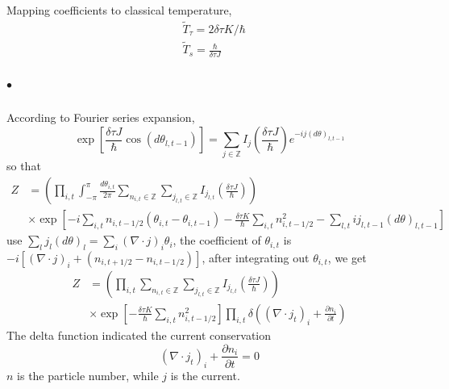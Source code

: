 Mapping coefficients to classical temperature, 
\begin{equation} \label{Temp_mapping}
    \begin{aligned}
        & \tilde{T}_{\tau} = 2 \delta \tau K /\hbar\\
        & \tilde{T}_{s} = \frac{\hbar}{\delta \tau J}
    \end{aligned}
\end{equation}
\subparagraph*{$\bullet$}
According to Fourier series expansion, 
\begin{equation}
    \exp \left[
        \frac{\delta \tau J}{\hbar} 
            \cos(d\theta_{l, t-1}) \right]
        = \sum_{j \in \mathbb{Z}} I_j(\frac{\delta \tau J}{\hbar} )
            e^{-ij(d\theta)_{l, t-1}}
\end{equation}
so that
\begin{equation}
    \begin{aligned}
        Z 
        & = \left(
            \prod_{i, t} \int_{-\pi}^{\pi} \frac{d\theta_{i, t}}{2\pi} 
            \sum_{n_{i, t} \in \mathbb{Z} }
            \sum_{j_{l, t} \in \mathbb{Z} } I_{j_{l, t}}(\frac{\delta \tau J}{\hbar})
            \right)  \\
        & \times \exp \left[ 
            -i\sum_{i, t} n_{i, t-1/2} (\theta_{i, t} - \theta_{i, t-1})
            -\frac{\delta \tau K}{\hbar} 
            \sum_{i, t} n_{i, t-1/2}^2 
            - \sum_{l, t} ij_{l, t-1}(d\theta)_{l, t-1}
        \right]
    \end{aligned}
\end{equation}
use $ \sum_l j_l (d\theta)_l = \sum_i (\nabla \cdot j)_i \theta_i $, the coefficient of $\theta_{i, t}$ is $ -i[(\nabla \cdot j)_i +(n_{i, t+1/2} - n_{i, t-1/2})]$, after integrating out $\theta_{i,t}$, we get 
\begin{equation} \label{Current_rep}
    \begin{aligned}
        Z 
        & = \left(
            \prod_{i, t}
            \sum_{n_{i, t} \in \mathbb{Z} }
            \sum_{j_{l, t} \in \mathbb{Z} } I_{j_{l, t}}(\frac{\delta \tau J}{\hbar})
            \right)   \\     
        & \times \exp \left[
            -\frac{\delta \tau K}{\hbar} 
                \sum_{i, t} n_{i, t-1/2}^2 
        \right]
        \prod_{i, t} \delta \left((\nabla \cdot j_t)_i + \frac{\partial n_i}{\partial t}\right)
    \end{aligned}
\end{equation}
The delta function indicated the current conservation
\begin{equation}
    (\nabla \cdot j_t)_i + \frac{\partial n_i}{\partial t} = 0
\end{equation} 
$n$ is the particle number, while $j$ is the current. 

